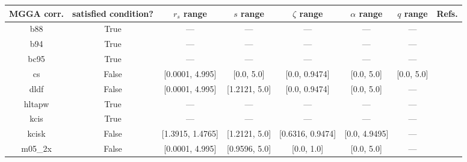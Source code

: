 \begin{tabular}{|c|c|c|c|c|c|c|l|}
\hline
   MGGA corr. &  satisfied condition? &      $r_s$ range &        $s$ range &    $\zeta$ range & $\alpha$ range & $q$ range  &                                                                              Refs. \\ \hline
          b88 &                  True &              --- &              --- &              --- &            --- &        --- &                                                              \cite{Becke1988_1053} \\ \hline
          b94 &                  True &              --- &              --- &              --- &            --- &        --- &                                                               \cite{Becke1994_625} \\ \hline
         bc95 &                  True &              --- &              --- &              --- &            --- &        --- &                                                              \cite{Becke1996_1040} \\ \hline
           cs &                 False &  [0.0001, 4.995] &       [0.0, 5.0] &    [0.0, 0.9474] &     [0.0, 5.0] & [0.0, 5.0] &                                                   \cite{Colle1975_329,Lee1988_785} \\ \hline
         dldf &                 False &  [0.0001, 4.995] &    [1.2121, 5.0] &    [0.0, 0.9474] &     [0.0, 5.0] &        --- &                                                           \cite{Pernal2009_263201} \\ \hline
       hltapw &                  True &              --- &              --- &              --- &            --- &        --- &                                                             \cite{Lehtola2021_943} \\ \hline
         kcis &                  True &              --- &              --- &              --- &            --- &        --- & \cite{Rey1998_581,Krieger1999_463,Krieger2001_48,Kurth1999_889,Toulouse2002_10465} \\ \hline
        kcisk &                 False & [1.3915, 1.4765] &    [1.2121, 5.0] & [0.6316, 0.9474] &  [0.0, 4.9495] &        --- & \cite{Rey1998_581,Krieger1999_463,Krieger2001_48,Kurth1999_889,Toulouse2002_10465} \\ \hline
      m05\_2x &                 False &  [0.0001, 4.995] &    [0.9596, 5.0] &       [0.0, 1.0] &     [0.0, 5.0] &        --- &                                                                \cite{Zhao2006_364} \\ \hline

\end{tabular}
